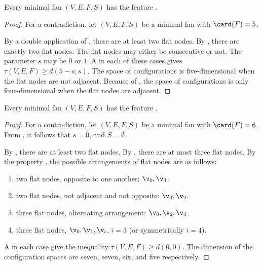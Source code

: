 \begin{lemma}\label{lemma:pentagon-free}\label{l:pf}
Every minimal fan $(V,E,F,S)$ has the feature .
\end{lemma}

\begin{proof}
For a contradiction, let $(V,E,F,S)$ be a minimal fan with $\card(F)=5$.  

By a double application of , there are at least two
flat nodes.  By , there are exactly two flat nodes.
The flat nodes may either be consecutive or not.  The parameter $s$
may be $0$ or $1$.  A  in each of
these cases gives $\tau(V,E,F)\ge d(5-s,s)$.  The space of
configurations is five-dimensional when the flat nodes are not
adjacent.  Because of , the space of
configurations is only four-dimensional when the flat nodes are
adjacent.
\end{proof}

\begin{lemma}\label{lemma:hexagon-free}\label{l:hf}
Every minimal fan $(V,E,F,S)$ has the feature .
\end{lemma}

\begin{proof}
For a contradiction, let $(V,E,F,S)$ be a minimal fan with $\card(F)=6$.
From , it follows that $s=0$, and $S=\emptyset$.

By , there are at least two flat nodes.  By
, there are at most three flat nodes.  By the
property , the possible arrangements of flat
nodes are as follows:
\begin{enumerate}\wasitemize 
\item two flat nodes, opposite to one another: $\v_0,\v_3$.
\item two flat nodes, not adjacent and not opposite: $\v_0,\v_2$.
\item three flat nodes, alternating arrangement: $\v_0,\v_2,\v_4$.
\item three flat nodes, $\v_0,\v_1,\v_i$, $i=3$ (or symmetrically $i=4$).
\end{enumerate}\wasitemize 
A  in each case give the inequality
$\tau(V,E,F)\ge d(6,0)$.  The dimension of the configuration spaces
are seven, seven, six, and five respectively.
\end{proof}  


